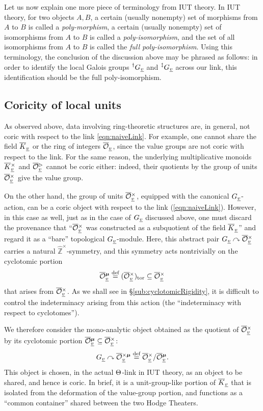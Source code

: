 \documentclass[12pt, reqno, a4paper]{amsart}
\def\udl#1{\underline{#1}} %
\def\what#1{\widehat{#1}} %
\def\eqdef{\stackrel{\textrm{def}}{=}} %
\def\acton{\curvearrowright} %
\def\bZ{\mathbb{Z}} %
\def\hbZ{\what{\bZ}} %
\def\uv{\udl{v}} %
\def\tor{\mathrm{tor}}
\begin{document}
Let us now explain one more piece of terminology from IUT theory.
In IUT theory, for two objects $A,B$, a certain (usually nonempty) set of morphisms from $A$ to $B$ is called a {\em poly-morphism}, a certain (usually nonempty) set of isomorphisms from $A$ to $B$ is called a {\em poly-isomorphism}, and the set of all isomorphisms from $A$ to $B$ is called the {\em full poly-isomorphism}.
Using this terminology, the conclusion of the discussion above may be phrased as follows: in order to identify the local Galois groups $\GG[\dag]_{\uv}$ and $\GG[\ddag]_{\uv}$ across our link, this identification should be the full poly-isomorphism.


\subsection{Coricity of local units}\label{sub:localUnits}
As observed above, data involving ring-theoretic structures are, in general, not coric with respect to the link \eqref{eqn:naiveLink}.
For example, one cannot share the field $\oK_{\uv}$ or the ring of integers $\oOO_{\uv}$, since the value groups are not coric with respect to the link.
For the same reason, the underlying multiplicative monoids $\oKx_{\uv}$ and $\oOOt_{\uv}$ cannot be coric either: indeed, their quotients by the group of units $\oOOx_{\uv}$ give the value group.

On the other hand, the group of units $\oOOx_{\uv}$, equipped with the canonical $\GG_{\uv}$-action, can be a coric object with respect to the link (\ref{eqn:naiveLink}).
However, in this case as well, just as in the case of $\GG_{\uv}$ discussed above, one must discard the provenance that ``$\oOOx_{\uv}$ was constructed as a subquotient of the field $\oK_{\uv}$'' and regard it as a ``bare'' topological $\GG_{\uv}$-module.
Here, this abstract pair $\GG_{\uv}\acton\oOOx_{\uv}$ carries a natural $\hbZ^{\times}$-symmetry, and this symmetry acts nontrivially on the cyclotomic portion
\[
\oOOmu_{\uv} \eqdef (\oOOx_{\uv})_{\tor} \subseteq \oOOx_{\uv}
\]
that arises from $\oOOx_{\uv}$.
As we shall see in \S\ref{sub:cyclotomicRigidity}, it is difficult to control the indeterminacy arising from this action (the ``indeterminacy with respect to cyclotomes'').

We therefore consider the mono-analytic object obtained as the quotient of $\oOOx_{\uv}$ by its cyclotomic portion $\oOOmu_{\uv} \subseteq \oOOx_{\uv}$:
\[
\GG_{\uv}\acton \oOOxmu_{\uv} \eqdef \oOOx_{\uv}/\oOOmu_{\uv}.
\]
This object is chosen, in the actual $\Th$-link in IUT theory, as an object to be shared, and hence is coric. In brief, it is a unit-group-like portion of $\oK_{\uv}$ that is isolated from the deformation of the value-group portion, and functions as a ``common container'' shared between the two Hodge Theaters.
\end{document}
